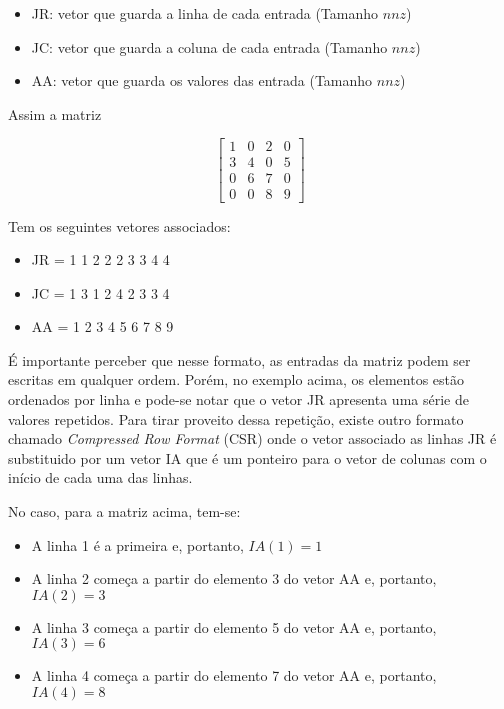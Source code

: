 \begin{itemize}
    \item JR: vetor que guarda a linha de cada entrada (Tamanho $nnz$)
    \item JC: vetor que guarda a coluna de cada entrada (Tamanho $nnz$)
    \item AA: vetor que guarda os valores das entrada (Tamanho $nnz$)
\end{itemize}


Assim a matriz

\begin{equation}
    \begin{bmatrix}
        1 & 0 & 2 & 0\\ 
        3 & 4 & 0 & 5\\ 
        0 & 6 & 7 & 0\\ 
        0 & 0 & 8 &9 
    \end{bmatrix}
\end{equation}

Tem os seguintes vetores associados:

\begin{center}
    \begin{itemize}
        \item JR = 1 1 2 2 2 3 3 4 4
        \item JC = 1 3 1 2 4 2 3 3 4
        \item AA = 1 2 3 4 5 6 7 8 9
    \end{itemize}
\end{center}

É importante perceber que nesse formato, as entradas da matriz podem ser escritas em qualquer ordem. Porém, no exemplo acima, os elementos estão ordenados por linha e pode-se notar que o vetor JR apresenta uma série de valores repetidos. Para tirar proveito dessa repetição, existe outro formato chamado \textit{Compressed Row Format} (CSR) onde o vetor associado as linhas JR é substituido por um vetor IA que é um ponteiro para o vetor de colunas com o início de cada uma das linhas.

No caso, para a matriz acima, tem-se:

\begin{itemize}
    \item A linha 1 é a primeira e, portanto, $IA(1) = 1$
    \item A linha 2 começa a partir do elemento 3 do vetor AA e, portanto, $IA(2) = 3$
    \item A linha 3 começa a partir do elemento 5 do vetor AA e, portanto, $IA(3) = 6$
    \item A linha 4 começa a partir do elemento 7 do vetor AA e, portanto, $IA(4) = 8$
\end{itemize}

